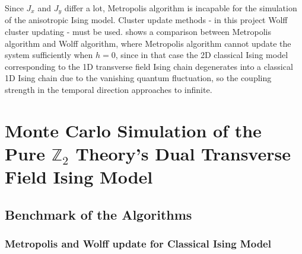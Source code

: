 \documentclass[hyperref, a4paper]{article}
\newcommand*{\Ztwo}{$\mathbb{Z}_2$ }
\newcommand*{\cim}{classical Ising model }
\newcommand*{\CIM}{Classical Ising Model }
\begin{document}
Since $J_x$ and $J_y$ differ a lot, Metropolis algorithm is incapable for the simulation of the anisotropic Ising model.
Cluster update methods - in this project Wolff cluster updating \cite{Wolff_1989} - must be used.
 shows a comparison between Metropolis algorithm and Wolff algorithm, 
where Metropolis algorithm cannot update the system sufficiently when $h=0$, 
since in that case the 2D \cim corresponding to the 1D transverse field Ising chain degenerates into a classical 1D Ising chain due to the vanishing quantum fluctuation, 
so the coupling strength in the temporal direction approaches to infinite.

\section{Monte Carlo Simulation of the Pure \Ztwo Theory's Dual Transverse Field Ising Model}

\subsection{Benchmark of the Algorithms}

\subsubsection{Metropolis and Wolff update for \CIM}
\end{document}
